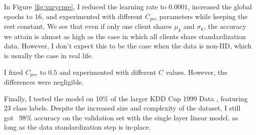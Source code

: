 In Figure \ref{fig:varycpre}, I reduced the learning rate to $0.0001$, increased the global epochs to $16$, and experimented with different $C_{pre}$ parameters while keeping the rest constant.
We see that even if only one client shares $\mu_k$ and $\sigma_k$, the accuracy we attain is almost as high as the case in which all clients share standardization data.
However, I don't expect this to be the case when the data is non-IID, which is usually the case in real life.

I fixed $C_{pre}$ to $0.5$ and experimented with different $C$ values.
However, the differences were negligible.

Finally, I tested the model on 10\% of the larger KDD Cup 1999 Data \citep{kdd}, featuring 23 class labels.
Despite the increased size and complexity of the dataset, I still got ~98\% accuracy on the validation set with the single layer linear model, as long as the data standardization step is in-place.
